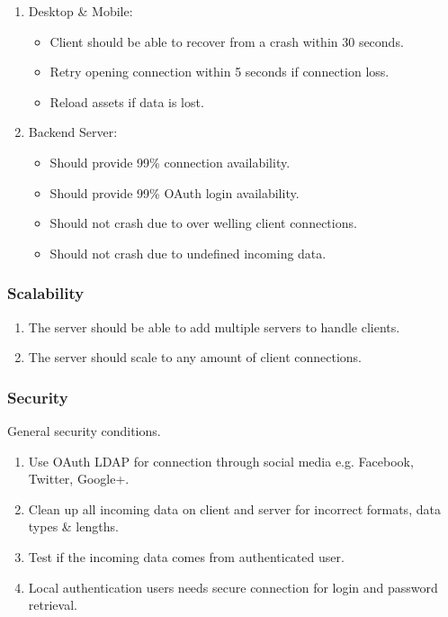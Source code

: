 \documentclass[letterpaper]{article}
\begin{document}
			\begin{enumerate}
				\item Desktop \& Mobile:
					\begin{itemize}
						\item Client should be able to recover from a crash within 30 seconds.
						\item Retry opening connection within 5 seconds if connection loss.
						\item Reload assets if data is lost.
					\end{itemize}
				\item Backend Server:
					\begin{itemize}
						\item Should provide 99\% connection availability.
						\item Should provide 99\% OAuth login availability.
						\item Should not crash due to over welling client connections.
						\item Should not crash due to undefined incoming data.
					\end{itemize}
			\end{enumerate}
			
			\subsubsection*{Scalability}
			\vspace{0.1in}
			
			\begin{enumerate}
				\item The server should be able to add multiple servers to handle clients.
				\item The server should scale to any amount of client connections.
			\end{enumerate}
			
			\subsubsection*{Security}
			\vspace{0.1in}
			
			General security conditions.
			\begin{enumerate}
				\item Use OAuth LDAP for connection through social media e.g. Facebook, Twitter, Google+.
				\item Clean up all incoming data on client and server for incorrect formats, data types \& lengths.
				\item Test if the incoming data comes from authenticated user.
				\item Local authentication users needs secure connection for login and password retrieval.
			\end{enumerate}
			
\end{document}
